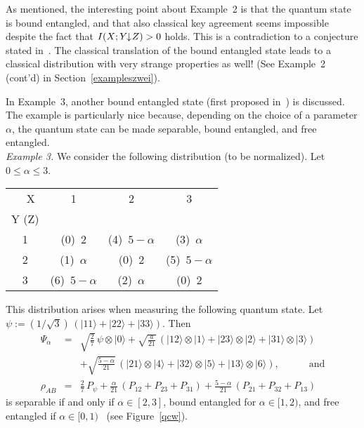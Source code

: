\documentclass{article}
\newcommand{\noi}{\noindent}
\newcommand{\al}{\alpha}
\newcommand{\ida}{I(X;Y\hspace{-1.3mm}\downarrow\hspace{-0.8mm} Z)}
\begin{document}
As mentioned,
the interesting point about Example~2 is that the quantum state is
bound entangled, and that also classical key agreement seems 
impossible despite the fact that $\ida>0$ holds. This is a  contradiction 
 to a conjecture stated in~\cite{ittrans}. 
The classical translation of the bound entangled state leads to a classical 
distribution with very strange properties as well! (See 
Example~2 (cont'd) in Section~\ref{exampleszwei}).

In
Example~3, another  bound entangled state (first proposed in~\cite{dreih}) is discussed. 
The example  is particularly 
nice because, depending on the choice of a parameter $\al$, the quantum 
state can be made separable, bound entangled, and free entangled.
\\ 




\noi
{\it Example 3.}
We consider the following  distribution (to be normalized).
Let $0\leq \al \leq 3$.
\\
\begin{center}
\begin{tabular}{|c||c|c|c|}
\hline
\ \ X & 1 & 2 & 3\\
Y (Z) &&&\\
\hline\hline
1 & (0)\ 2 & (4)\ $5-\al$ & (3)\ $\al$\\
\hline
2 & (1)\ $\al$ & (0)\ 2 & (5)\ $5-\al$\\
\hline
3 & (6)\ $5-\al$ & (2)\ $\al$ & (0)\ 2\\
\hline
\end{tabular}
\end{center}
This distribution arises when measuring the following quantum state.
Let 
$
\psi:=(1/\sqrt{3})\, (|11\rangle+|22\rangle+|33\rangle).
$
Then 
\begin{eqnarray*}
\Psi_{\al} & = & \sqrt{\frac{2}{7}}\, \psi\otimes|0\rangle + 
\sqrt{\frac{a}{21}}\, (|12\rangle\otimes|1\rangle+|23\rangle\otimes|2\rangle
+|31\rangle\otimes|3\rangle)\\
&& 
+ 
\sqrt{\frac{5-\al}{21}}\, (|21\rangle\otimes|4\rangle 
+|32\rangle\otimes|5\rangle
+|13\rangle\otimes|6\rangle),\qquad\quad\mbox{and}\\
\rho_{AB} & = & \frac{2}{7}\, P_{\psi} + \frac{\al}{21}\, 
(P_{12}+P_{23}+P_{31}) + \frac{5-\al}{21}\, (P_{21}+P_{32}+P_{13})
\end{eqnarray*}
is separable if and only if $\al\in[2,3]$, bound entangled for $\al\in [1,2)$, 
and 
free entangled if $\al\in[0,1)$~\cite{dreih} (see Figure~\ref{qcw}).
\end{document}
